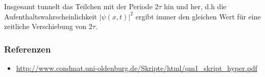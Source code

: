 Insgesamt tunnelt das Teilchen mit der Periode \(2\tau\) hin und her, d.h die Aufenthaltswahrscheinlichkeit  \(|\psi(x,t)|^2\) ergibt immer den gleichen Wert für eine zeitliche Verschiebung von \(2\tau\).


\subsubsection{Referenzen}

\begin{itemize}
\item \url{http://www.condmat.uni-oldenburg.de/Skripte/html/qm1_skript_hyper.pdf}
\end{itemize}




